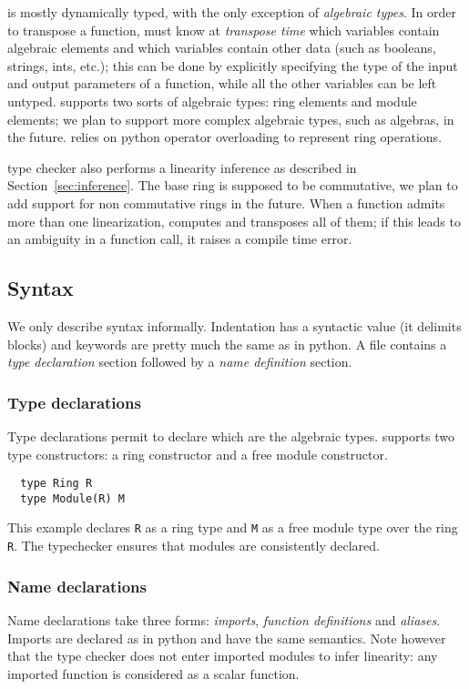 \tALpy{} is mostly dynamically typed, with the only exception of
\emph{algebraic types}. In order to transpose a function, \tALpy{}
must know at \emph{transpose time} which variables contain algebraic
elements and which variables contain other data (such as booleans,
strings, ints, etc.); this can be done by explicitly specifying the
type of the input and output parameters of a function, while all the
other variables can be left untyped. \tALpy{} supports two sorts of
algebraic types: ring elements and module elements; we plan to support
more complex algebraic types, such as algebras, in the
future. \tALpy{} relies on python operator overloading to represent
ring operations.

\tALpy{} type checker also performs a linearity inference as described
in Section~\ref{sec:inference}. The base ring is supposed to be
commutative, we plan to add support for non commutative rings in the
future. When a function admits more than one linearization, \tALpy{}
computes and transposes all of them; if this leads to an ambiguity in
a function call, it raises a compile time error.


\subsection{Syntax}
\label{sec:syntax}
We only describe \tALpy{} syntax informally. Indentation has a
syntactic value (it delimits blocks) and keywords are pretty much the
same as in python. A \tALpy{} file contains a \emph{type declaration}
section followed by a \emph{name definition} section.

\subsubsection{Type declarations}
Type declarations permit to declare which are the algebraic types.
\tALpy{} supports two type constructors: a ring constructor and a free
module constructor.

\begin{lstlisting}
  type Ring R
  type Module(R) M
\end{lstlisting}

This example declares \lstinline+R+ as a ring type and \lstinline+M+
as a free module type over the ring \lstinline+R+. The typechecker
ensures that modules are consistently declared.


\subsubsection{Name declarations}
Name declarations take three forms: \emph{imports}, \emph{function
  definitions} and \emph{aliases}. Imports are declared as in python
and have the same semantics. Note however that the type checker does
not enter imported modules to infer linearity: any imported function
is considered as a scalar function.

